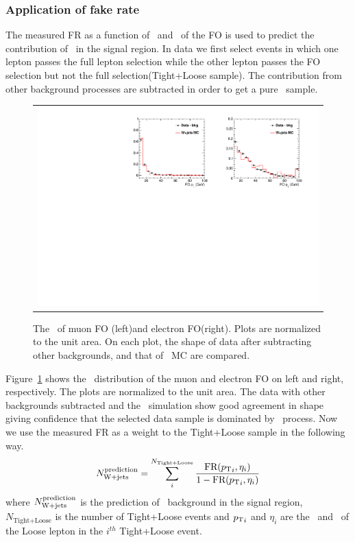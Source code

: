\subsubsection{Application of fake rate}

The measured FR as a function of \pt\ and \Eta\ of the FO is used to predict the 
contribution of \Wjets\ in the signal region. In data we first select events 
in which one lepton passes the full lepton selection while the other lepton 
passes the FO selection but not the full selection(Tight+Loose sample). 
The contribution from other 
background processes are subtracted in order to get a pure \Wjets\ sample. 
\begin{figure}[htp] 
\centering 
\begin{tabular}{c} 
\includegraphics[width=1.00\textwidth]{figures/FOpT_0j_of.pdf} 
\end{tabular} 
\caption{The \pt\ of muon FO (left)and electron FO(right). 
Plots are normalized to the unit area. 
On each plot, the shape of data after subtracting other backgrounds,
and that of \Wjets\ MC are compared. }
\label{fig:FOpT} 
\end{figure} 
Figure~\ref{fig:FOpT} shows the \pt\ distribution of the muon and electron FO
on left and right, respectively. The plots are normalized to the unit area.
The data with other backgrounds subtracted and the \Wjets\ simulation show good
agreement in shape giving confidence that the selected data sample
is dominated by \Wjets\ process. Now we use the measured FR as a weight to the 
Tight+Loose sample in the following way.   
\begin{eqnarray} 
N_{\mathrm{W+jets}}^{\textrm{prediction}} 
= \sum_i^{N_{\textrm{Tight+Loose}}} \frac{\textrm{FR}({p_\mathrm{T}}_i, \eta_i)}{1 - \textrm{FR}({p_\mathrm{T}}_i, \eta_i)}    
\end{eqnarray} 
where $N_{\mathrm{W+jets}}^{\textrm{prediction}}$ is the prediction of \Wjets\ background 
in the signal region, $N_{\textrm{Tight+Loose}}$ is the number of Tight+Loose events
and ${p_\mathrm{T}}_i$ and $\eta_i$ are the \pt\ and \Eta\ of the Loose lepton in the $i^{th}$ 
Tight+Loose event.

